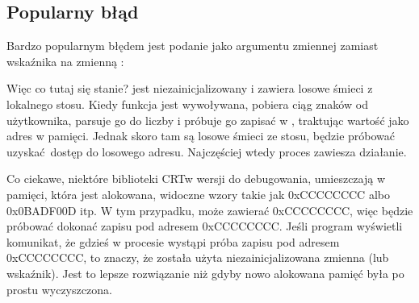 \subsection{Popularny błąd}

Bardzo popularnym błędem jest podanie jako argumentu zmiennej  zamiast wskaźnika na zmienną :



Więc co tutaj się stanie?
 jest niezainicjalizowany i zawiera losowe śmieci z lokalnego stosu.
Kiedy funkcja \scanf jest wywoływana, pobiera ciąg znaków od użytkownika, parsuje go do liczby i próbuje go zapisać w , traktując wartość  jako adres w pamięci.
Jednak skoro tam są losowe śmieci ze stosu, \scanf będzie próbować uzyskać dostęp do losowego adresu.
Najczęściej wtedy proces zawiesza działanie.

Co ciekawe, niektóre biblioteki \ac{CRT}w wersji do debugowania, umieszczają w pamięci, która jest alokowana, widoczne wzory takie jak  0xCCCCCCCC albo 0x0BADF00D itp.
W tym przypadku,  może zawierać 0xCCCCCCCC, więc \scanf będzie próbować dokonać zapisu pod adresem 0xCCCCCCCC.
Jeśli program wyświetli komunikat, że gdzieś w procesie wystąpi próba zapisu pod adresem 0xCCCCCCCC, to znaczy, że
została użyta niezainicjalizowana zmienna (lub wskaźnik).
Jest to lepsze rozwiązanie niż gdyby nowo alokowana pamięć była po prostu wyczyszczona.
